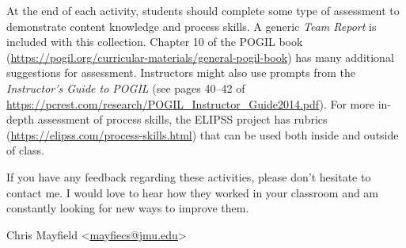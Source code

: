 \bigskip

At the end of each activity, students should complete some type of assessment to demonstrate content knowledge and process skills. A generic \textit{Team Report} is included with this collection. Chapter 10 of the POGIL book (\url{https://pogil.org/curricular-materials/general-pogil-book}) has many additional suggestions for assessment. Instructors might also use prompts from the \textit{Instructor's Guide to POGIL} (see pages 40--42 of \url{https://pcrest.com/research/POGIL_Instructor_Guide2014.pdf}). For more in-depth assessment of process skills, the ELIPSS project has rubrics (\url{https://elipss.com/process-skills.html}) that can be used both inside and outside of class.

\bigskip

If you have any feedback regarding these activities, please don't hesitate to contact me. I would love to hear how they worked in your classroom and am constantly looking for new ways to improve them.

\bigskip

\newcommand{\email}[1]{<\href{mailto:#1}{#1}>}

Chris Mayfield \email{mayfiecs@jmu.edu}

